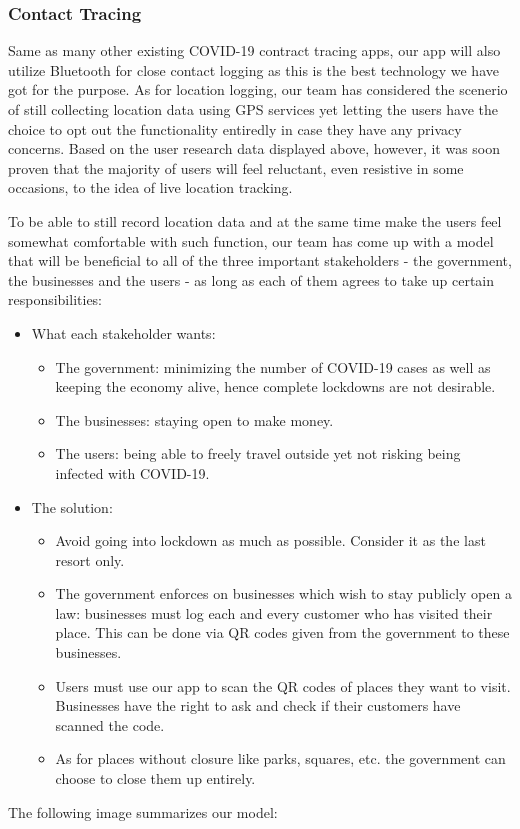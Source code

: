   \subsubsection{Contact Tracing}
  \par Same as many other existing COVID-19 contract tracing apps, our app will also utilize Bluetooth for close contact logging as this is the best technology we have got for the purpose. As for location logging, our team has considered the scenerio of still collecting location data using GPS services yet letting the users have the choice to opt out the functionality entiredly in case they have any privacy concerns. Based on the user research data displayed above, however, it was soon proven that the majority of users will feel reluctant, even resistive in some occasions, to the idea of live location tracking.
  \par To be able to still record location data and at the same time make the users feel somewhat comfortable with such function, our team has come up with a model that will be beneficial to all of the three important stakeholders - the government, the businesses and the users - as long as each of them agrees to take up certain responsibilities:
  \begin{itemize}
    \item What each stakeholder wants:
      \begin{itemize}
        \item The government: minimizing the number of COVID-19 cases as well as keeping the economy alive, hence complete lockdowns are not desirable.
        \item The businesses: staying open to make money.
        \item The users: being able to freely travel outside yet not risking being infected with COVID-19.
      \end{itemize}
    \item The solution:
      \begin{itemize}
        \item Avoid going into lockdown as much as possible. Consider it as the last resort only.
        \item The government enforces on businesses which wish to stay publicly open a law: businesses must log each and every customer who has visited their place. This can be done via QR codes given from the government to these businesses.
        \item Users must use our app to scan the QR codes of places they want to visit. Businesses have the right to ask and check if their customers have scanned the code. 
        \item As for places without closure like parks, squares, etc. the government can choose to close them up entirely.
      \end{itemize}
  \end{itemize}
  \par The following image summarizes our model:

